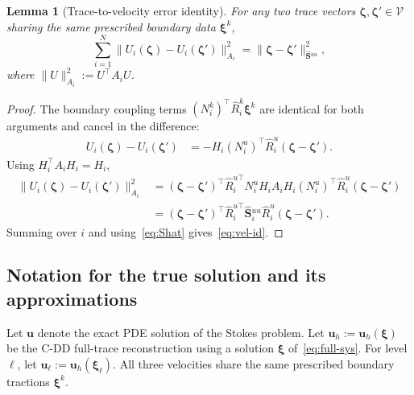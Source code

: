 \documentclass[11pt,a4paper]{article}
\newtheorem{lemma}[theorem]{Lemma}
\theoremstyle{definition}
\newcommand{\vel}{\bm{u}}
\newcommand{\Schur}{\mathbf{S}}
\newcommand{\Shatuu}{\widehat{\Schur}{}^{uu}}
\newcommand{\Vspace}{\mathcal{V}}
\begin{document}
\begin{lemma}[Trace-to-velocity error identity]\label{lem:vel-id}
  For any two trace vectors $\bm{\zeta},\bm{\zeta}'\in\Vspace$ sharing
  the same prescribed boundary data $\bm{\xi}^k$,
  \begin{equation}\label{eq:vel-id}
    \sum_{i=1}^N \|U_i(\bm{\zeta}) - U_i(\bm{\zeta}')\|_{A_i}^2
    = \|\bm{\zeta} - \bm{\zeta}'\|_{\Shatuu}^2,
  \end{equation}
  where $\|U\|_{A_i}^2 := U^\top A_i U$.
\end{lemma}

\begin{proof}
  The boundary coupling terms $(N_i^k)^\top \widehat{R}_i^k \bm{\xi}^k$
  are identical for both arguments and cancel in the difference:
  \begin{align*}
    U_i(\bm{\zeta}) - U_i(\bm{\zeta}')
    &= -H_i (N_i^u)^\top \widehat{R}_i^u (\bm{\zeta} - \bm{\zeta}').
  \end{align*}
  Using $H_i^\top A_i H_i = H_i$,
  \begin{align*}
    \|U_i(\bm{\zeta}) - U_i(\bm{\zeta}')\|_{A_i}^2
    &= (\bm{\zeta}-\bm{\zeta}')^\top \widehat{R}_i^{u\top}
       N_i^u H_i A_i H_i (N_i^u)^\top \widehat{R}_i^u
       (\bm{\zeta}-\bm{\zeta}') \\
    &= (\bm{\zeta}-\bm{\zeta}')^\top \widehat{R}_i^{u\top}
       \Shatuu_i \widehat{R}_i^u (\bm{\zeta}-\bm{\zeta}').
  \end{align*}
  Summing over $i$ and using~\eqref{eq:Shat} gives~\eqref{eq:vel-id}.
\end{proof}

\subsection{Notation for the true solution and its approximations}

Let $\vel$ denote the exact PDE solution of the Stokes problem.
Let $\vel_h := \vel_h(\bm{\xi})$ be the C-DD full-trace reconstruction
using a solution $\bm{\xi}$ of~\eqref{eq:full-sys}.
For level $\ell$, let $\vel_\ell := \vel_h(\bm{\xi}_\ell)$.
All three velocities share the same prescribed boundary tractions
$\bm{\xi}^k$.
\end{document}
